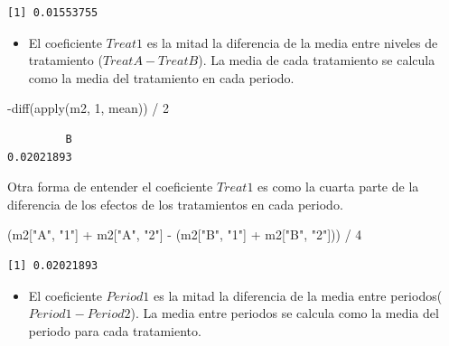 \documentclass[
  12pt,
  a4paper,
  extrafontsizes,
  onecolumn,
  openright]{memoir}
\newenvironment{Shaded}{\begin{snugshade}}{\end{snugshade}}
\newcommand{\DecValTok}[1]{\textcolor[rgb]{0.68,0.00,0.00}{#1}}
\newcommand{\FunctionTok}[1]{\textcolor[rgb]{0.28,0.35,0.67}{#1}}
\newcommand{\NormalTok}[1]{\textcolor[rgb]{0.00,0.23,0.31}{#1}}
\newcommand{\SpecialCharTok}[1]{\textcolor[rgb]{0.37,0.37,0.37}{#1}}
\newcommand{\StringTok}[1]{\textcolor[rgb]{0.13,0.47,0.30}{#1}}
\providecommand{\tightlist}{%
  \setlength{\itemsep}{0pt}\setlength{\parskip}{0pt}}\usepackage{longtable,booktabs,array}
\begin{document}
\begin{verbatim}
[1] 0.01553755
\end{verbatim}

\normalsize

\begin{itemize}
\tightlist
\item
  El coeficiente \(Treat1\) es la mitad la diferencia de la media entre
  niveles de tratamiento (\(TreatA-TreatB\)). La media de cada
  tratamiento se calcula como la media del tratamiento en cada periodo.
\end{itemize}

\scriptsize

\begin{Shaded}
\begin{Highlighting}[]
\SpecialCharTok{{-}}\FunctionTok{diff}\NormalTok{(}\FunctionTok{apply}\NormalTok{(m2, }\DecValTok{1}\NormalTok{, mean)) }\SpecialCharTok{/} \DecValTok{2}
\end{Highlighting}
\end{Shaded}

\begin{verbatim}
         B 
0.02021893 
\end{verbatim}

\normalsize

Otra forma de entender el coeficiente \(Treat1\) es como la cuarta parte
de la diferencia de los efectos de los tratamientos en cada periodo.

\scriptsize

\begin{Shaded}
\begin{Highlighting}[]
\NormalTok{(m2[}\StringTok{"A"}\NormalTok{, }\StringTok{"1"}\NormalTok{] }\SpecialCharTok{+}\NormalTok{ m2[}\StringTok{"A"}\NormalTok{, }\StringTok{"2"}\NormalTok{] }\SpecialCharTok{{-}}\NormalTok{ (m2[}\StringTok{"B"}\NormalTok{, }\StringTok{"1"}\NormalTok{] }\SpecialCharTok{+}\NormalTok{ m2[}\StringTok{"B"}\NormalTok{, }\StringTok{"2"}\NormalTok{])) }\SpecialCharTok{/} \DecValTok{4}
\end{Highlighting}
\end{Shaded}

\begin{verbatim}
[1] 0.02021893
\end{verbatim}

\normalsize

\begin{itemize}
\tightlist
\item
  El coeficiente \(Period1\) es la mitad la diferencia de la media entre
  periodos(\(Period1 - Period2\)). La media entre periodos se calcula
  como la media del periodo para cada tratamiento.
\end{itemize}
\end{document}
